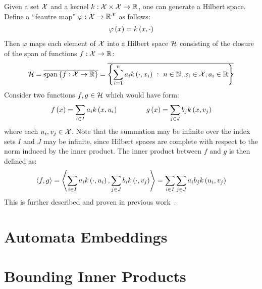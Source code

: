\documentclass[12pt]{article}
\begin{document}
Given a set \(\mathcal{X}\) and a kernel
\(k : \mathcal{X} \times \mathcal{X} \to \mathbb{R}\),
one can generate a Hilbert space.
Define a ``feautre map'' \(\varphi : \mathcal{X} \to \mathbb{R}^{\mathcal{X}}\)
as follows:
\begin{align*}
  \varphi\left(x\right) = k\left(x, \cdot\right)
\end{align*}
Then \(\varphi\) maps each element of \(\mathcal{X}\)
into a Hilbert space \(\mathcal{H}\) consisting of the closure of
the span of functions \(f : \mathcal{X} \to \mathbb{R}\):
\begin{align*}
  \mathcal{H} =
    \overline{\mathrm{span}\left\{f : \mathcal{X} \to \mathbb{R}\right\}}
    = \overline{
        \left\{
          \sum_{i = 1}^{n} a_i k\left(\cdot, x_i\right)
            \  : \  n \in \mathbb{N}, x_i \in \mathcal{X}, a_i \in \mathbb{R}\right\}}
\end{align*}
Consider two functions \(f, g \in \mathcal{H}\) which would have form:
\begin{align*}
  f\left(x\right) = \sum_{i \in I} a_i k\left(x, u_i\right)
  \qquad \qquad
  g\left(x\right) = \sum_{j \in J} b_j k\left(x, v_j\right)
\end{align*}
where each \(u_i, v_j \in \mathcal{X}\).
Note that the summation may be infinite over the index sets \(I\)
and \(J\) may be infinite, since Hilbert spaces are complete with
respect to the norm induced by the inner product.
The inner product between \(f\) and \(g\) is then defined as:
\begin{align*}
  \left\langle f, g\right\rangle
    = \left\langle\sum_{i \in I} a_i k\left(\cdot, u_i\right),
              \sum_{j \in J} b_i k\left(\cdot, v_j\right)\right\rangle
    = \sum_{i \in I} \sum_{j \in J} a_i b_j k\left(u_i, v_j\right)
\end{align*}
This is further described and proven in previous
work~\cite{cortes2004rational, vishwanathan2010graph}.



\section{Automata Embeddings}



\section{Bounding Inner Products}



\printbibliography
\end{document}
